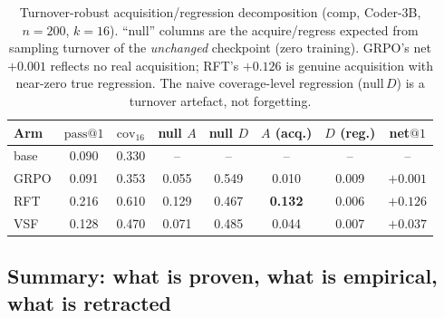 \begin{table}[htbp]
\centering
\caption{Turnover-robust acquisition/regression decomposition (comp, Coder-3B,
$n{=}200$, $k{=}16$). ``null'' columns are the acquire/regress expected from
sampling turnover of the \emph{unchanged} checkpoint (zero training). GRPO's net
$+0.001$ reflects no real acquisition; RFT's $+0.126$ is genuine acquisition with
near-zero true regression. The naive coverage-level regression ($\text{null}\,D$)
is a turnover artefact, not forgetting.}
\label{tab:alphabeta}
\begin{tabular}{lccccccc}
\toprule
Arm & $\text{pass}@1$ & $\mathrm{cov}_{16}$ & null $A$ & null $D$ & $A$ (acq.) & $D$ (reg.) & net$@1$ \\
\midrule
base & 0.090 & 0.330 & --    & --    & --    & --    & --      \\
GRPO & 0.091 & 0.353 & 0.055 & 0.549 & 0.010 & 0.009 & $+0.001$ \\
RFT  & 0.216 & 0.610 & 0.129 & 0.467 & \textbf{0.132} & 0.006 & $\mathbf{+0.126}$ \\
VSF  & 0.128 & 0.470 & 0.071 & 0.485 & 0.044 & 0.007 & $+0.037$ \\
\bottomrule
\end{tabular}
\end{table}

\subsection*{Summary: what is proven, what is empirical, what is retracted}

